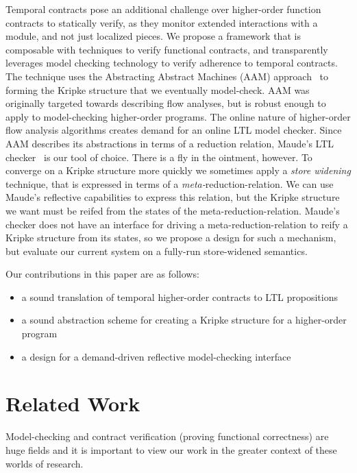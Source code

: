\documentclass[preprint,onecolumn,9pt]{sigplanconf} %
\begin{document}
Temporal contracts pose an additional challenge over higher-order function contracts to statically verify, as they monitor extended interactions with a module, and not just localized pieces.
%
We propose a framework that is composable with techniques to verify functional contracts, and transparently leverages model checking technology to verify adherence to temporal contracts.
%
The technique uses the Abstracting Abstract Machines (AAM) approach~\citet{dvanhorn:AAM} to forming the Kripke structure that we eventually model-check.
%
AAM was originally targeted towards describing flow analyses, but is robust enough to apply to model-checking higher-order programs.
%
The online nature of higher-order flow analysis algorithms creates demand for an online LTL model checker.
%
Since AAM describes its abstractions in terms of a reduction relation, Maude's LTL checker~\citep{?} is our tool of choice.
%
There is a fly in the ointment, however.
%
To converge on a Kripke structure more quickly we sometimes apply a \emph{store widening} technique, that is expressed in terms of a \emph{meta-}reduction-relation.
%
We can use Maude's reflective capabilities to express this relation, but the Kripke structure we want must be reifed from the states of the meta-reduction-relation.
%
Maude's checker does not have an interface for driving a meta-reduction-relation to reify a Kripke structure from its states, so we propose a design for such a mechanism, but evaluate our current system on a fully-run store-widened semantics.

Our contributions in this paper are as follows:
\begin{itemize}
 \item{a sound translation of temporal higher-order contracts to LTL propositions}
 \item{a sound abstraction scheme for creating a Kripke structure for a higher-order program}
 \item{a design for a demand-driven reflective model-checking interface}
\end{itemize}

\section{Related Work}

Model-checking and contract verification (proving functional correctness) are huge fields and it is important to view our work in the greater context of these worlds of research.
\end{document}
